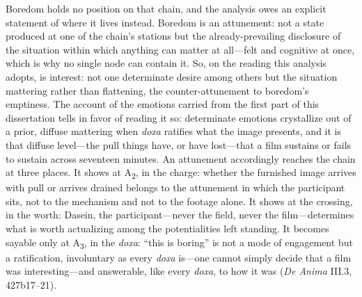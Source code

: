 Boredom holds no position on that chain, and the analysis owes an explicit statement of where
it lives instead. Boredom is an attunement: not a state produced at one of the chain's stations
but the already-prevailing disclosure of the situation within which anything can matter at
all---felt and cognitive at once, which is why no single node can contain it. So, on the
reading this analysis adopts, is interest: not one determinate desire among others but the
situation mattering rather than flattening, the counter-attunement to boredom's emptiness. The
account of the emotions carried from the first part of this dissertation tells in favor of
reading it so: determinate emotions crystallize out of a prior, diffuse mattering when
\textit{doxa} ratifies what the image presents, and it is that diffuse level---the pull things
have, or have lost---that a film sustains or fails to sustain across seventeen minutes. An
attunement accordingly reaches the chain at three places. It shows at A\textsubscript{2}, in
the charge: whether the furnished image arrives with pull or arrives drained belongs to the
attunement in which the participant sits, not to the mechanism and not to the footage alone. It
shows at the crossing, in the worth: Dasein, the participant---never the field, never the
film---determines what is worth actualizing among the potentialities left standing. It becomes
sayable only at A\textsubscript{3}, in the \textit{doxa}: ``this is boring'' is not a mode of
engagement but a ratification, involuntary as every \textit{doxa} is---one cannot simply decide
that a film was interesting---and answerable, like every \textit{doxa}, to how it was
(\textit{De Anima} III.3, 427b17--21).


